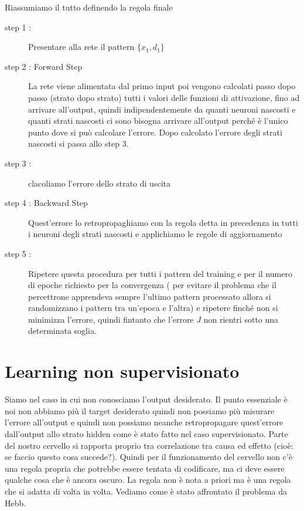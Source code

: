 \noindent Riassumiamo il tutto definendo la regola finale
\begin{description}
\item[step 1 :] Presentare alla rete il pattern  $\{x_1, d_1\}$ 
\item[step 2 : Forward Step] La rete viene alimentata dal primo input poi vengono calcolati passo dopo passo (strato dopo strato) tutti i valori delle funzioni di attivazione, fino ad arrivare all'output, quindi indipendentemente da quanti neuroni nascosti e quanti strati nascosti ci sono bisogna arrivare all'output perché è l'unico punto dove si può calcolare l'errore. Dopo calcolato l'errore degli strati nascosti si passa allo step 3.
\item[step 3 :] clacoliamo l'errore dello strato di uscita
\item[step 4 : Backward Step] Quest'errore lo retropropaghiamo con la regola detta in precedenza in tutti i neuroni degli strati nascosti e applichiamo le regole di aggiornamento 
\item[step 5 :] Ripetere questa procedura per tutti i pattern del training e per il numero di epoche richiesto per la convergenza ( per evitare il problema che il percettrone apprendeva sempre l'ultimo pattern processato allora si randomizzano i pattern tra un’epoca e l’altra) e ripetere finché non si minimizza l'errore, quindi fintanto che l'errore $J$ non rientri sotto una determinata soglia.
\end{description}

\section{Learning non supervisionato}
Siamo nel caso in cui non conosciamo l'output desiderato. Il punto essenziale è noi non abbiamo più il target desiderato quindi non possiamo più misurare l'errore all'output e quindi non possiamo neanche retropropagare quest'errore dall'output allo strato hidden come è stato fatto nel caso supervisionato.  Parte del nostro cervello si rapporta proprio tra correlazione tra causa ed effetto (cioè: se faccio questo cosa succede?). Quindi per il funzionamento del cervello non c'è una regola propria che potrebbe essere tentata di codificare, ma ci deve essere qualche cosa che è ancora oscuro. La regola non è nota a priori ma è una regola che si adatta di volta in volta. Vediamo come è stato affrontato il problema da Hebb.\\


